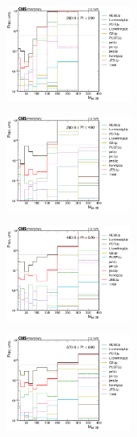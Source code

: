\begin{figure}[ht!]
  \centering
  \begin{subfigure}
    \centering
    \includegraphics[width=0.45\textwidth]{figures/multijet/unfolding/dijet/unfolded_fracUnc_groomed_0.png}
\end{subfigure}
  \begin{subfigure}
    \centering
    \includegraphics[width=0.45\textwidth]{figures/multijet/unfolding/dijet/unfolded_fracUnc_groomed_1.png}
\end{subfigure}
  \begin{subfigure}
    \centering
    \includegraphics[width=0.45\textwidth]{figures/multijet/unfolding/dijet/unfolded_fracUnc_groomed_2.png}
\end{subfigure}
\begin{subfigure}
    \centering
    \includegraphics[width=0.45\textwidth]{figures/multijet/unfolding/dijet/unfolded_fracUnc_groomed_3.png}

\end{subfigure}
\end{figure}
